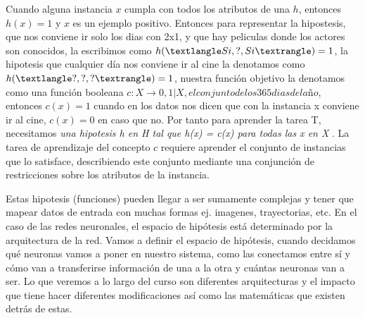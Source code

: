 Cuando alguna instancia $x$ cumpla con todos los atributos de una \(h\), entonces \(h(x) = 1 \) y $x$ es un ejemplo positivo. Entonces para representar la hipostesis, que nos conviene ir solo los dias con 2x1, y que hay peliculas donde los actores son conocidos, la escribimos como $h(\textlangle Si, ?, Si\textrangle) = 1 $, la hipotesis que cualquier día nos conviene ir al cine la denotamos como $h(\textlangle ?, ?, ?\textrangle) = 1 $, nuestra función objetivo la denotamos como una función booleana $c:X \rightarrow {0,1} | X, el conjunto de los 365 dias del año$, entonces $c(x) = 1$ cuando en los datos nos dicen que con la instancia x conviene ir al cine, $c(x) = 0$ en caso que no. Por tanto para aprender la tarea T, necesitamos \emph{una hipotesis h en H tal que h(x) = c(x) para todas las x en X }. La tarea de aprendizaje del concepto $c$ requiere aprender el conjunto de instancias que lo satisface, describiendo este conjunto mediante una conjunción de restricciones sobre los atributos de la instancia.  

Estas hipotesis (funciones) pueden llegar a ser sumamente complejas y tener que mapear datos de entrada con muchas formas ej. imagenes, trayectorias, etc. En el caso de las redes neuronales, el espacio de hipótesis está determinado por la arquitectura de la red.
Vamos a definir el espacio de hipótesis, cuando decidamos qué neuronas vamos a poner en nuestro sistema, como las conectamos entre sí y cómo van a transferirse información de una a la otra y cuántas neuronas van a ser. Lo que veremos a lo largo del curso son diferentes arquitecturas y el impacto que tiene hacer diferentes modificaciones así como las matemáticas que existen detrás de estas. 

